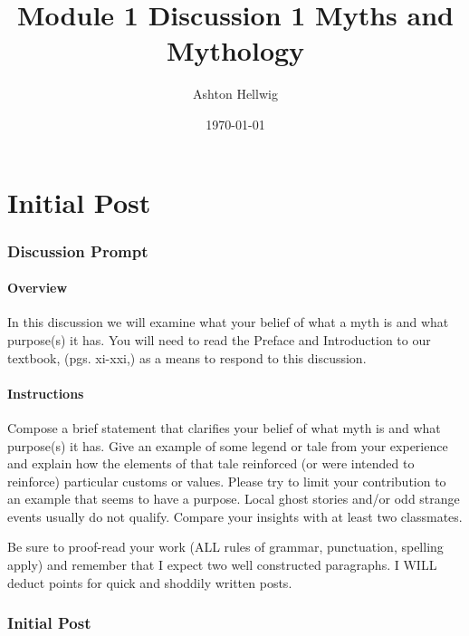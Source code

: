 \documentclass[12pt]{article}
\title{%
    Module 1 Discussion 1%
    \large{Myths and Mythology}
  }
\author{Ashton Hellwig}
\date{\today}
\theoremstyle{definition}
\theoremstyle{plain}
\begin{document}
  \maketitle
  \tableofcontents
  \newpage


  \part{Initial Post}

    \section{Discussion Prompt}
      \begin{mdframed}
        \subsection{Overview}
          In this discussion we will examine what your belief of what a myth is
            and what purpose(s) it has.  You will need to read the Preface and
            Introduction to our textbook, (pgs. xi-xxi,) as a means to respond
            to this discussion.

        \subsection{Instructions}
          Compose a brief statement that clarifies your belief of what myth is
            and what purpose(s) it has. Give an example of some legend or tale
            from your experience and explain how the elements of that tale
            reinforced (or were intended to reinforce) particular customs or
            values. Please try to limit your contribution to an example that
            seems to have a purpose. Local ghost stories and/or odd strange
            events usually do not qualify. Compare your insights with at least
            two classmates.

          Be sure to proof-read your work (ALL rules of grammar, punctuation,
            spelling apply) and remember that I expect two well constructed
            paragraphs. I WILL deduct points for quick and shoddily written
            posts.
      \end{mdframed}

    \section{Initial Post}
\end{document}
